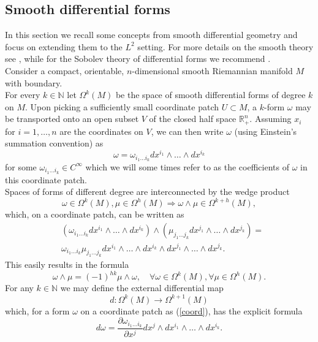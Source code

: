 \documentclass{ifacconf}
\newcommand{\R}{\mathbb{R}}
\newcommand{\N}{\mathbb{N}}
\newcommand{\drh}[2]{\Omega^{#2}(#1)}
\begin{document}
\subsection{Smooth differential forms}
In this section we recall some concepts from smooth differential geometry and focus on extending them to the $L^2$ setting. For more details on the smooth theory see \cite{Lee:12}, while for the Sobolev theory of differential forms we recommend \cite{AR:06}.\\
Consider a compact, orientable, $n$-dimensional smooth Riemannian manifold $M$ with boundary.\\
For every $k\in\N$ let $\drh{M}{k}$ be the space of smooth differential forms of degree $k$ on $M$. Upon picking a sufficiently small coordinate patch $U\subset M$,  a $k$-form $\omega$ may be transported onto an open subset $V$ of the closed half space $\R^n_+$. Assuming $x_i$ for $i=1,\dots,n$ are the coordinates on $V$, we can then write $\omega$ (using Einstein's summation convention) as
\begin{equation}\label{coord}
    \omega = \omega_{i_1\dots i_k} dx^{i_1}\wedge \dots\wedge dx^{i_k}
\end{equation}
for some $\omega_{i_1\dots i_k} \in C^{\infty}$ which we will some times refer to as the coefficients of $\omega$ in this coordinate patch.\\
Spaces of forms of different degree are interconnected by the wedge product
\[
    \omega\in\drh{M}{k},\mu\in\drh{M}{h}\Rightarrow\omega\wedge\mu\in\drh{M}{k+h},
\]
which, on a coordinate patch, can be written as
\begin{align}\label{wedge}
    &(\omega_{i_1\dots i_k} dx^{i_1}\wedge \dots\wedge dx^{i_k})\wedge (\mu_{j_1\dots j_k} dx^{j_1}\wedge \dots\wedge dx^{j_k})=\nonumber\\
    & \omega_{i_1\dots i_k}\mu_{j_1\dots j_k}dx^{i_1}\wedge \dots\wedge dx^{i_k}\wedge dx^{j_1}\wedge \dots\wedge dx^{j_k}.
\end{align}
This easily results in the formula
\begin{equation}\label{swap}
    \omega\wedge\mu=(-1)^{hk}\mu\wedge\omega,\quad \forall\omega\in\drh{M}{k},\forall\mu\in\drh{M}{h}.
\end{equation}
For any $k\in \N$ we may define the external differential map
\[
    d\colon \drh{M}{k}\to\drh{M}{k+1}
\]
which, for a form $\omega$ on a coordinate patch as (\ref{coord}), has the explicit formula
\[
    d\omega = \frac{\partial\omega_{i_1\dots i_k}}{\partial x^j} dx^j\wedge dx^{i_1}\wedge \dots\wedge dx^{i_k}.
\]
\end{document}
